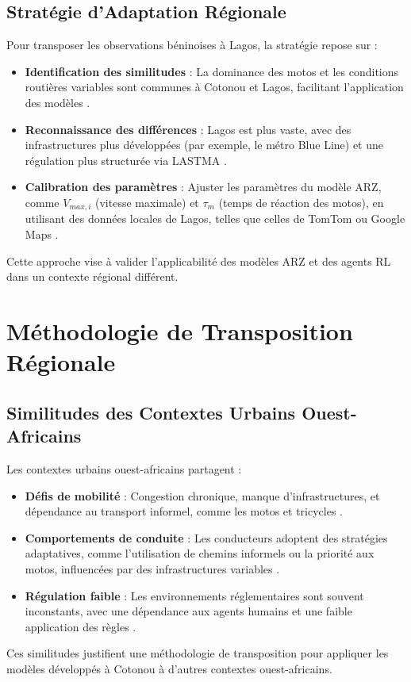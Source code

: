 \subsection{Stratégie d'Adaptation Régionale}
Pour transposer les observations béninoises à Lagos, la stratégie repose sur :
\begin{itemize}
    \item \textbf{Identification des similitudes} : La dominance des motos et les conditions routières variables sont communes à Cotonou et Lagos, facilitant l'application des modèles \cite{kumar2011urban}.
    \item \textbf{Reconnaissance des différences} : Lagos est plus vaste, avec des infrastructures plus développées (par exemple, le métro Blue Line) et une régulation plus structurée via LASTMA \cite{lastma2020}.
    \item \textbf{Calibration des paramètres} : Ajuster les paramètres du modèle ARZ, comme \(V_{max,i}\) (vitesse maximale) et \(\tau_m\) (temps de réaction des motos), en utilisant des données locales de Lagos, telles que celles de TomTom ou Google Maps \cite{ludi2020traffic}.
\end{itemize}
Cette approche vise à valider l'applicabilité des modèles ARZ et des agents RL dans un contexte régional différent.

\section{Méthodologie de Transposition Régionale}

\subsection{Similitudes des Contextes Urbains Ouest-Africains}
Les contextes urbains ouest-africains partagent :
\begin{itemize}
    \item \textbf{Défis de mobilité} : Congestion chronique, manque d'infrastructures, et dépendance au transport informel, comme les motos et tricycles \cite{kumar2011urban}.
    \item \textbf{Comportements de conduite} : Les conducteurs adoptent des stratégies adaptatives, comme l'utilisation de chemins informels ou la priorité aux motos, influencées par des infrastructures variables \cite{atakiti2016traffic}.
    \item \textbf{Régulation faible} : Les environnements réglementaires sont souvent inconstants, avec une dépendance aux agents humains et une faible application des règles \cite{gomina2013urban}.
\end{itemize}
Ces similitudes justifient une méthodologie de transposition pour appliquer les modèles développés à Cotonou à d'autres contextes ouest-africains.

